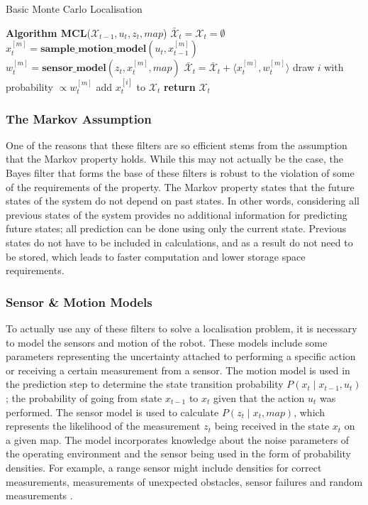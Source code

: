 \documentclass[conference]{IEEEtran}
\begin{document}
\begin{algorithm}
  \caption{Basic Monte Carlo Localisation \cite{thrun}}
  \label{alg:basicMCL}
  \begin{algorithmic}[1]
    \State \textbf{Algorithm MCL}\textnormal{($\mathcal{X}_{t-1}, u_t, z_t, map$)}
    \State $\bar{\mathcal{X}}_t=\mathcal{X}_t=\emptyset$
    \State $x_t^{[m]}=\textbf{sample\_motion\_model}(u_t,x_{t-1}^{[m]})$
    \State $w_t^{[m]}=\textbf{sensor\_model}(z_t,x_t^{[m]},map)$
    \State $\bar{\mathcal{X}}_t=\bar{\mathcal{X}}_t+\langle x_t^{[m]},w_t^{[m]}\rangle$
    \EndFor
    \State \textnormal{draw $i$ with probability $\propto w_t^{[m]}$}
    \State \textnormal{add $x_t^{[i]}$ to $\mathcal{X}_t$}
    \EndFor
    \State \textbf{return} $\mathcal{X}_t$
  \end{algorithmic}
\end{algorithm}

\subsubsection{The Markov Assumption}
One of the reasons that these filters are so efficient stems from the assumption that the Markov property holds. While this may not actually be the case, the Bayes filter that forms the base of these filters is robust to the violation of some of the requirements of the property. The Markov property states that the future states of the system do not depend on past states. In other words, considering all previous states of the system provides no additional information for predicting future states; all prediction can be done using only the current state. Previous states do not have to be included in calculations, and as a result do not need to be stored, which leads to faster computation and lower storage space requirements.

\subsubsection{Sensor \& Motion Models}
To actually use any of these filters to solve a localisation problem, it is necessary to model the sensors and motion of the robot. These models include some parameters representing the uncertainty attached to performing a specific action or receiving a certain measurement from a sensor. The motion model is used in the prediction step to determine the state transition probability $P(x_t\mid x_{t-1}, u_t)$; the probability of going from state $x_{t-1}$ to $x_t$ given that the action $u_t$ was performed. The sensor model is used to calculate $P(z_t\mid x_t,map)$, which represents the likelihood of the measurement $z_t$ being received in the state $x_t$ on a given map. The model incorporates knowledge about the noise parameters of the operating environment and the sensor being used in the form of probability densities. For example, a range sensor might include densities for correct measurements, measurements of unexpected obstacles, sensor failures and random measurements \cite{thrun}. 
\end{document}
